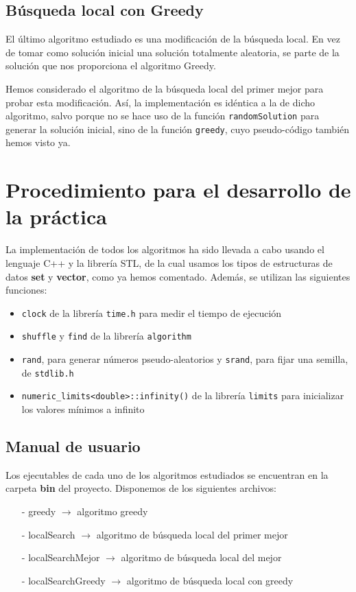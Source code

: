 \documentclass[11pt,a4paper]{article}
\begin{document}
	
	
	\subsection{Búsqueda local con Greedy}
	
	El último algoritmo estudiado es una modificación de la búsqueda local. En vez de tomar como solución inicial una solución totalmente aleatoria, se parte de la solución que nos proporciona el algoritmo Greedy. 
	
	Hemos considerado el algoritmo de la búsqueda local del primer mejor para probar esta modificación. 
	Así, la implementación es idéntica a la de dicho algoritmo, salvo porque no se hace uso de la función \lstinline|randomSolution| para generar la solución inicial, sino de la función \lstinline|greedy|, cuyo pseudo-código también hemos visto ya. 
	


	\section{Procedimiento para el desarrollo de la práctica}
	
	La implementación de todos los algoritmos ha sido llevada a cabo usando el lenguaje C++ y la librería STL, de la cual usamos los tipos de estructuras de datos \textbf{set} y \textbf{vector}, como ya hemos comentado. Además, se utilizan las siguientes funciones:
	\begin{itemize}
		\item \lstinline|clock| de la librería \lstinline|time.h| para medir el tiempo de ejecución
		\item  \lstinline|shuffle| y \lstinline|find| de la librería \lstinline|algorithm|
		\item \lstinline|rand|, para generar números pseudo-aleatorios y \lstinline|srand|, para fijar una semilla, de \lstinline|stdlib.h|
		\item  \lstinline|numeric_limits<double>::infinity()| de la librería \lstinline|limits| para inicializar los valores mínimos a infinito
	\end{itemize} 

	\subsection{Manual de usuario}
	
	Los ejecutables de cada uno de los algoritmos estudiados se encuentran en la carpeta \textbf{bin} del proyecto. Disponemos de los siguientes archivos:
	\begin{itemize}
		\item [-] greedy $ \rightarrow $ algoritmo greedy
			\item [-] localSearch $ \rightarrow $  algoritmo de búsqueda local del primer mejor
			\item [-]  localSearchMejor $ \rightarrow $ algoritmo de búsqueda local del mejor 
			\item [-]  localSearchGreedy $ \rightarrow $  algoritmo de búsqueda local con greedy
	\end{itemize}
	
\end{document}
